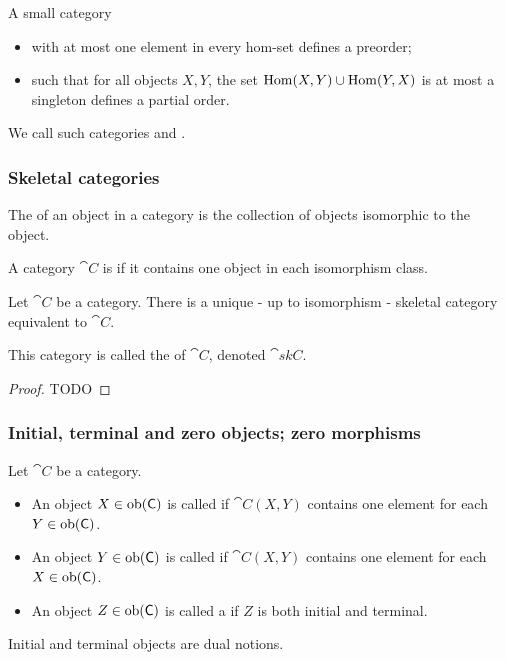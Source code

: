 \begin{lemma}
A small category
\begin{itemize}
\item with at most one element in every hom-set defines a preorder;
\item such that for all objects $X,Y$, the set $\operatorname{Hom}(X,Y)\cup \operatorname{Hom}(Y,X)$ is at most a singleton defines a partial order.
\end{itemize}
\end{lemma}
We call such categories  and .

\subsubsection{Skeletal categories}
\begin{definition}
The  of an object in a category is the collection of objects isomorphic to the object.

A category $\cat{C}$ is  if it contains one object in each isomorphism class.
\end{definition}
\begin{lemma}
Let $\cat{C}$ be a category.
There is a unique - up to isomorphism - skeletal category equivalent to $\cat{C}$.
\end{lemma}
This category is called the  of $\cat{C}$, denoted $\cat{skC}$.
\begin{proof}
TODO
\end{proof}

\subsubsection{Initial, terminal and zero objects; zero morphisms}
\begin{definition}
Let $\cat{C}$ be a category.
\begin{itemize}
\item An object $X\in\operatorname{ob}(\mathsf{C})$ is called  if $\cat{C}(X,Y)$ contains one element for each $Y\in\operatorname{ob}(\mathsf{C})$.
\item An object $Y\in\operatorname{ob}(\mathsf{C})$ is called  if $\cat{C}(X,Y)$ contains one element for each $X\in\operatorname{ob}(\mathsf{C})$.
\item An object $Z\in\operatorname{ob}(\mathsf{C})$ is called a  if $Z$ is both initial and terminal.
\end{itemize}
\end{definition}
Initial and terminal objects are dual notions.

